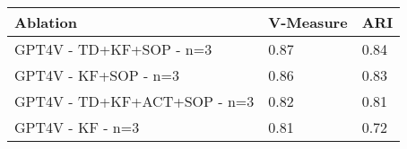 \begin{tabular}{lll}
\toprule
Ablation & V-Measure & ARI \\
\midrule
GPT4V - TD+KF+SOP - n=3 & 0.87 & 0.84 \\
GPT4V - KF+SOP - n=3 & 0.86 & 0.83 \\
GPT4V - TD+KF+ACT+SOP - n=3 & 0.82 & 0.81 \\
GPT4V - KF - n=3 & 0.81 & 0.72 \\
\bottomrule
\end{tabular}
